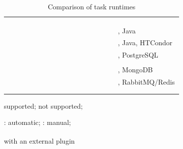 \begin{table}[h]
\begin{threeparttable}
\begin{tabular}{|l|B|A|C|C|A|l|}
	\dask{}\hfill\cite{dask} & \no & \no & \yes{} & \yes{} & \no &
	\automaticmap\textsuperscript{\dag} & \automaticft & \yes\textsuperscript{\dag} & \yes & \yes & \yes & \no & \no & \yes & \yes & \python \\
	\ray{}\hfill\cite{ray} & \no & \no & \yes & \yes & \no & \automaticmap & \automaticft & \no & \yes & \yes & \yes & \no & \no & \yes & \partially & \python \\
	\parsl{}\hfill\cite{parsl} & \no & \no & \yes & \yes & \no & \automaticmap & \automaticft & \yes & \no & \yes & \no & \no & \yes & \yes & \no & \python \\
	\pycompss{}\hfill\cite{pycompss} & \yes & \no & \yes & \yes & \no & \manualmap & \automaticft &
	\no & \no & \yes & \no & \no & \yes & \yes & \yes & \python, Java \\
	\pegasus{}\hfill\cite{pegasus} & \no & \yes & \yes & \yes & \yes & \manualmap & \automaticft &
	\no & \no & \yes & \no & \no & \no & \no & \yes & \python, Java, HTCondor~\cite{htcondor} \\
	\balsam{}\hfill\cite{balsam} & \no & \no & \yes & \yes & \no & \automaticmap & \automaticft & \yes & \yes & \yes & \no & \no & \yes & \yes & \no & \python, PostgreSQL \\
	\autosubmit{}\hfill\cite{autosubmit} & \no & \yes & \no & \yes & \no & \manualmap & \automaticft &
	\yes & \no & \yes & \no & \no & \yes & \no & \no & \python \\
	\fireworks{}\hfill\cite{fireworks} & \no & \yes & \yes & \yes & \no & \automaticmap & \manualft & \yes & \yes & \no & \no & \no & \no & \no & \no & \python, MongoDB \\
	\merlin{}\hfill\cite{merlin} & \no & \yes & \no & \yes & \no & \automaticmap & \manualft & \no & \no & \yes & \no & \no & \yes & \no & \no & \python, RabbitMQ/Redis \\
	\snakemake{}\hfill\cite{snakemake} & \no & \yes & \yes & \no & \yes & \manualmap & \automaticft & \no & \no & \yes & \yes & \no & \yes & \no & \no & \python \\[2mm]
	\hyperqueue{}\hfill\cite{hyperqueue} & \yes & \yes & \yes & \yes & \no & \automaticmap & \automaticft & \yes & \yes & \yes & \yes & \yes & \yes & \no & \yes & \\
	\bottomrule
\end{tabular}
\begin{tablenotes}
	\centering
	\item \yes{} supported; \no{} not supported;
	\item \automaticmap{}: automatic; \manualmap{}: manual;
	\item \textsuperscript{\dag}with an external plugin
\end{tablenotes}
\caption{Comparison of task runtimes}
\label{tab:hq-tools-comparison}
\end{threeparttable}
\end{table}

